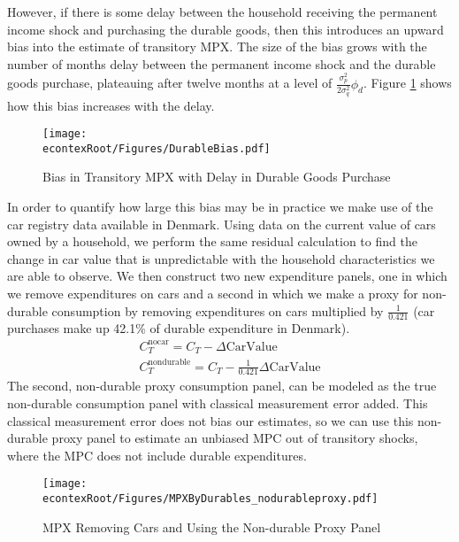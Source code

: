 \documentclass[titlepage]{\econtex}\newcommand{\texname}{ConsumptionHeterogeneity}
\begin{document}
However, if there is some delay between the household receiving the permanent income shock and purchasing the durable goods, then this introduces an upward bias into the estimate of transitory MPX. The size of the bias grows with the number of months delay between the permanent income shock and the durable goods purchase, plateauing after twelve months at a level of $\frac{\sigma^2_p}{2\sigma^2_q}\phi_d$. Figure \ref{fig:durable_bias} shows how this bias increases with the delay.
\begin{figure} 
	\begin{centering}
		\texttt{[image: \\econtexRoot/Figures/DurableBias.pdf]}
		\caption{Bias in Transitory MPX with Delay in Durable Goods Purchase}
		\label{fig:durable_bias}
	\end{centering}
\end{figure}

In order to quantify how large this bias may be in practice we make use of the car registry data available in Denmark. Using data on the current value of cars owned by a household, we perform the same residual calculation to find the change in car value that is unpredictable with the household characteristics we are able to observe. We then construct two new expenditure panels, one in which we remove expenditures on cars and a second in which we make a proxy for non-durable consumption by removing expenditures on cars multiplied by $\frac{1}{0.421}$ (car purchases make up 42.1\% of durable expenditure in Denmark).
\begin{align*}
C_T^{\text{nocar}} = C_T - \Delta \text{CarValue} \\
C_T^{\text{nondurable}} = C_T - \frac{1}{0.421}\Delta \text{CarValue}
\end{align*}
The second, non-durable proxy consumption panel, can be modeled as the true non-durable consumption panel with classical measurement error added. This classical measurement error does not bias our estimates, so we can use this non-durable proxy panel to estimate an unbiased MPC out of transitory shocks, where the MPC does not include durable expenditures.
\begin{figure} 
	\begin{centering}
		\texttt{[image: \\econtexRoot/Figures/MPXByDurables\_nodurableproxy.pdf]}
		\caption{MPX Removing Cars and Using the Non-durable Proxy Panel}
		\label{fig:MPXByDurables}
	\end{centering}
\end{figure}
\end{document}

